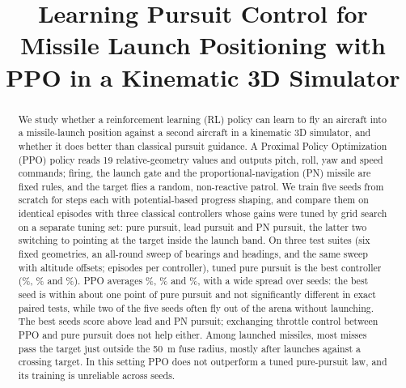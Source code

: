 \documentclass[conference]{IEEEtran}
\begin{document}
\title{Learning Pursuit Control for Missile Launch Positioning with PPO in a Kinematic 3D Simulator}

\author{
}

\maketitle

\begin{abstract}
We study whether a reinforcement learning (RL) policy can learn to fly an aircraft into a missile-launch position against a second aircraft in a kinematic 3D simulator, and whether it does better than classical pursuit guidance. A Proximal Policy Optimization (PPO) policy reads 19 relative-geometry values and outputs pitch, roll, yaw and speed commands; firing, the launch gate and the proportional-navigation (PN) missile are fixed rules, and the target flies a random, non-reactive patrol. We train five seeds from scratch for \RTrainSteps{} steps each with potential-based progress shaping, and compare them on identical episodes with three classical controllers whose gains were tuned by grid search on a separate tuning set: pure pursuit, lead pursuit and PN pursuit, the latter two switching to pointing at the target inside the launch band. On three test suites (six fixed geometries, an all-round sweep of bearings and headings, and the same sweep with altitude offsets; \REpisodesPerRun{} episodes per controller), tuned pure pursuit is the best controller (\RPureSixRate\%, \RPureSweepRate\% and \RPureAltRate\%). PPO averages \RPpoSixRate\%, \RPpoSweepRate\% and \RPpoAltRate\%, with a wide spread over seeds: the best seed is within about one point of pure pursuit and not significantly different in exact paired tests, while two of the five seeds often fly out of the arena without launching. The best seeds score above lead and PN pursuit; exchanging throttle control between PPO and pure pursuit does not help either. Among launched missiles, most misses pass the target just outside the 50~m fuse radius, mostly after launches against a crossing target. In this setting PPO does not outperform a tuned pure-pursuit law, and its training is unreliable across seeds.
\end{abstract}
\end{document}

